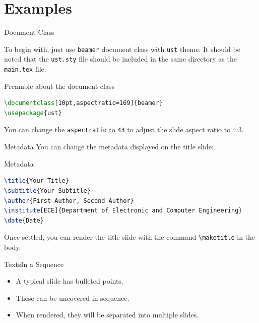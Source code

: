 \section{Examples}

\begin{frame}[fragile]{Document Class}

	To begin with, just use \texttt{beamer} document class with \texttt{ust} theme. It should be noted that the \texttt{ust.sty} file should be included in the same directory as the \texttt{main.tex} file.
	
\begin{block}{Preamble about the document class}
\begin{lstlisting}[language=TeX]
\documentclass[10pt,aspectratio=169]{beamer}
\usepackage{ust}
\end{lstlisting}
\end{block}
	
	You can change the \texttt{aspectratio} to \texttt{43} to adjust the slide aspect ratio to 4:3.
\end{frame}

\begin{frame}[fragile]{Metadata}
	You can change the metadata displayed on the title slide:

\begin{block}{Metadata}
\begin{lstlisting}[language=TeX]
\title{Your Title}
\subtitle{Your Subtitle}
\author{First Author, Second Author}
\institute[ECE]{Department of Electronic and Computer Engineering}
\date{Date}
\end{lstlisting}
\end{block}

	Once settled, you can render the title slide with the command \verb|\maketitle| in the body.
\end{frame}

\begin{frame}[fragile]{Texts}{In a Sequence}

	\begin{itemize}[<+->]
		\item A typical slide has bulleted points.
		\item These can be uncovered in sequence.
		\item When rendered, they will be separated into multiple slides.
	\end{itemize}

\end{frame}

